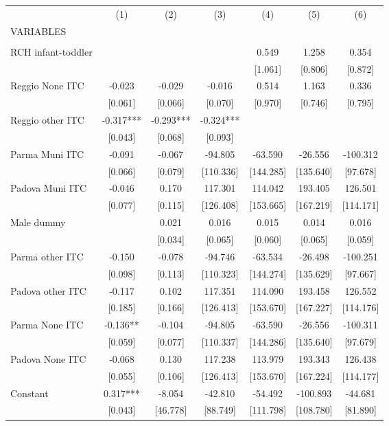 \begin{tabular}{lcccccc} \hline
 & (1) & (2) & (3) & (4) & (5) & (6) \\
VARIABLES &  &  &  &  &  &  \\ \hline
 &  &  &  &  &  &  \\
RCH infant-toddler &  &  &  & 0.549 & 1.258 & 0.354 \\
 &  &  &  & [1.061] & [0.806] & [0.872] \\
Reggio None ITC & -0.023 & -0.029 & -0.016 & 0.514 & 1.163 & 0.336 \\
 & [0.061] & [0.066] & [0.070] & [0.970] & [0.746] & [0.795] \\
Reggio other ITC & -0.317*** & -0.293*** & -0.324*** &  &  &  \\
 & [0.043] & [0.068] & [0.093] &  &  &  \\
Parma Muni ITC & -0.091 & -0.067 & -94.805 & -63.590 & -26.556 & -100.312 \\
 & [0.066] & [0.079] & [110.336] & [144.285] & [135.640] & [97.678] \\
Padova Muni ITC & -0.046 & 0.170 & 117.301 & 114.042 & 193.405 & 126.501 \\
 & [0.077] & [0.115] & [126.408] & [153.665] & [167.219] & [114.171] \\
Male dummy &  & 0.021 & 0.016 & 0.015 & 0.014 & 0.016 \\
 &  & [0.034] & [0.065] & [0.060] & [0.065] & [0.059] \\
Parma other ITC & -0.150 & -0.078 & -94.746 & -63.534 & -26.498 & -100.251 \\
 & [0.098] & [0.113] & [110.323] & [144.274] & [135.629] & [97.667] \\
Padova other ITC & -0.117 & 0.102 & 117.351 & 114.090 & 193.458 & 126.552 \\
 & [0.185] & [0.166] & [126.413] & [153.670] & [167.227] & [114.176] \\
Parma None ITC & -0.136** & -0.104 & -94.805 & -63.590 & -26.556 & -100.311 \\
 & [0.059] & [0.077] & [110.337] & [144.286] & [135.640] & [97.679] \\
Padova None ITC & -0.068 & 0.130 & 117.238 & 113.979 & 193.343 & 126.438 \\
 & [0.055] & [0.106] & [126.413] & [153.670] & [167.224] & [114.177] \\
Constant & 0.317*** & -8.054 & -42.810 & -54.492 & -100.893 & -44.681 \\
 & [0.043] & [46.778] & [88.749] & [111.798] & [108.780] & [81.890] \\

\end{tabular}
